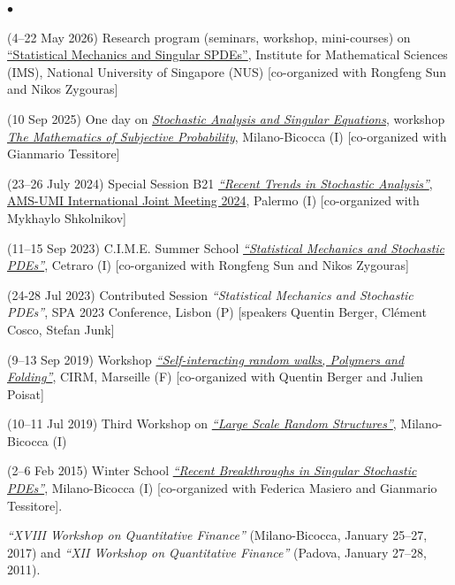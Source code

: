 \documentclass[a4paper,11pt,oneside]{amsart}
\newenvironment{myitemize}{%
\begin{list}{$\bullet$}%
 	{%
	\setlength{\itemsep}{0.3em}%
	\setlength{\topsep}{0.3em}%
	\setlength{\partopsep}{0em}%
	\setlength{\parsep}{0em}%
	\setlength{\parskip}{0em}%
	\setlength\leftmargin{1.5em}%
	\setlength\labelwidth{1.1em}%
	\setlength{\labelsep}{0.4em}%
	}%
	}%
{\end{list}}
\renewenvironment{itemize}{
\begin{myitemize}}%
{\end{myitemize}}
\begin{document}
\begin{itemize}
\item (4–22 May 2026) Research program (seminars, workshop, mini-courses) on \href{https://ims.nus.edu.sg/events/statistics_singularspdes/}{``Statistical Mechanics and Singular SPDEs''}, Institute for Mathematical Sciences (IMS), National University of Singapore (NUS) [co-organized with Rongfeng Sun and Nikos Zygouras]

\item (10 Sep 2025) One day on \href{https://fcaraven.github.io/bicocca2025/index.html}{\emph{Stochastic Analysis and Singular Equations}}, workshop
\href{https://www.msp2023.campus.unimib.it/home}{\emph{The Mathematics of Subjective Probability}}, Milano-Bicocca (I)
[co-organized with Gianmario Tessitore]

\item (23--26 July 2024) Special Session B21 \href{https://umi.dm.unibo.it/jm-umi-ams/index.php?gf-download=2024\%2F07\%2FFile-B-Example_B211.pdf&form-id=4&field-id=9&hash=148b5b5643cc04d7e55b9fd059f9abf5ea2621f856c56cff7d19e467b68fd82e}{\emph{``Recent Trends in Stochastic Analysis''}},
\href{https://umi.dm.unibo.it/jm-umi-ams/special-sessions/special-sessions-on-25-26-july-2024/}{AMS-UMI International Joint Meeting 2024}, Palermo (I)
[co-organized  with Mykhaylo Shkolnikov]

\item (11--15 Sep 2023) C.I.M.E. Summer School \href{https://fcaraven.github.io/cetraro2023/index.html}{\emph{``Statistical Mechanics and Stochastic PDEs''}},
Cetraro (I)
[co-organized with Rongfeng Sun and Nikos Zygouras]

\item (24-28 Jul 2023) Contributed Session \emph{``Statistical Mechanics and Stochastic PDEs''}, SPA 2023 Conference, Lisbon (P) [speakers Quentin Berger, Clément Cosco, Stefan Junk]

\item (9--13 Sep 2019) Workshop
\href{https://conferences.cirm-math.fr/2118.html}{\emph{``Self-interacting random walks, Polymers and Folding''}},
CIRM, Marseille (F)
[co-organized with Quentin Berger and Julien Poisat]

\item (10--11 Jul 2019)
Third Workshop on \href{https://fcaraven.github.io/prin2015/workshop-2019/index.html}{\emph{``Large Scale Random Structures''}}, Milano-Bicocca (I)

\item (2--6 Feb 2015) Winter School
\href{https://fcaraven.github.io/spdes2015/index.html}{\emph{``Recent Breakthroughs in Singular Stochastic PDEs''}},
Milano-Bicocca (I)
[co-organized with Federica Masiero and Gianmario Tessitore].

\item 
\emph{``XVIII Workshop on Quantitative Finance''} (Milano-Bicocca, January 25--27, 2017)
and
\emph{``XII Workshop on Quantitative Finance''} (Padova, January 27--28, 2011).
\end{itemize}
\end{document}
